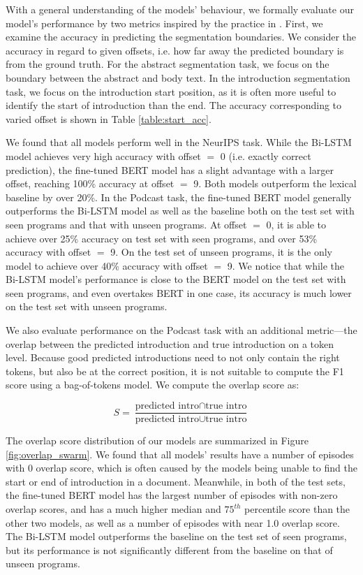 With a general understanding of the models' behaviour, we formally evaluate our model's performance by two metrics inspired by the practice in \citet{rajpurkar2016squad}. First, we examine the accuracy in predicting the segmentation boundaries. We consider the accuracy in regard to given offsets, i.e. how far away the predicted boundary is from the ground truth. For the abstract segmentation task, we focus on the boundary between the abstract and body text. In the introduction segmentation task, we focus on the introduction start position, as it is often more useful to identify the start of introduction than the end. The accuracy corresponding to varied offset is shown in Table \ref{table:start_acc}. 

We found that all models perform well in the NeurIPS task. While the Bi-LSTM model achieves very high accuracy with offset $=$ 0 (i.e. exactly correct prediction), the fine-tuned BERT model has a slight advantage with a larger offset, reaching 100\% accuracy at offset $=$ 9. Both models outperform the lexical baseline by over 20\%. In the Podcast task, the fine-tuned BERT model generally outperforms the Bi-LSTM model as well as the baseline both on the test set with seen programs and that with unseen programs. At offset $=$ 0, it is able to achieve over 25\% accuracy on test set with seen programs, and over 53\% accuracy with offset $=$ 9. On the test set of unseen programs, it is the only model to achieve over 40\% accuracy with offset $=$ 9. We notice that while the Bi-LSTM model's performance is close to the BERT model on the test set with seen programs, and even overtakes BERT in one case, its accuracy is much lower on the test set with unseen programs.


 We also evaluate performance on the Podcast task with an additional metric---the overlap between the predicted introduction and true introduction on a token level. Because good predicted introductions need to not only contain the right tokens, but also be at the correct position, it is not suitable to compute the F1 score using a bag-of-tokens model. We compute the overlap score as:

\begin{equation}
S = \frac{\textrm{predicted intro} \cap \textrm{true intro} }{\textrm{predicted intro} \cup\textrm{true intro}}
\end{equation}

The overlap score distribution of our models are summarized in Figure \ref{fig:overlap_swarm}. We found that all models' results have a number of episodes with 0 overlap score, which is often caused by the models being unable to find the start or end of introduction in a document. Meanwhile, in both of the test sets, the fine-tuned BERT model has the largest number of episodes with non-zero overlap scores, and has a much higher median and $75^{th}$ percentile score than the other two models, as well as a number of episodes with near 1.0 overlap score. The Bi-LSTM model outperforms the baseline on the test set of seen programs, but its performance is not significantly different from the baseline on that of unseen programs.

